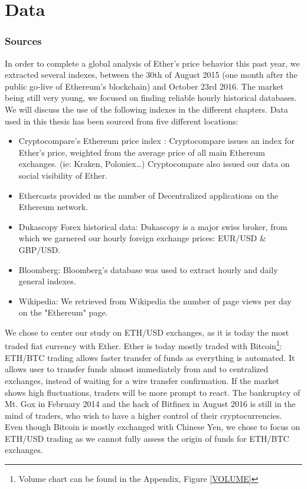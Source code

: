 \documentclass[11pt]{report}
\begin{document}
\clearpage
\chapter*{Data}
\subsection*{Sources}
In order to complete a global analysis of Ether’s price behavior this past year, we extracted several indexes, between the 30th of August 2015 (one month after the public go-live of Ethereum’s blockchain) and October 23rd 2016. The market being still very young, we focused on finding reliable hourly historical databases. We will discuss the use of the following indexes in the different chapters.\newline
 Data used in this thesis has been sourced from five different locations:\begin{itemize}
 \item Cryptocompare’s Ethereum price index \cite{CRYPTOCOMPARE}: Cryptocompare issues an index for Ether’s price, weighted from the average price of all main Ethereum exchanges. (ie: Kraken, Poloniex…) Cryptocompare also issued our data on social visibility of Ether.
 \item Ethercasts\cite{ETHERCASTS} provided us the number of Decentralized applications on the Ethereum network. 
 \item Dukascopy Forex historical data\cite{DUKASCOPY}: Dukascopy is a major swiss broker, from which we garnered our hourly foreign exchange prices: EUR/USD \& GBP/USD.
 \item Bloomberg: Bloomberg’s database was used to extract hourly and daily general indexes.
 \item Wikipedia: We retrieved from Wikipedia the number of page views per day on the "Ethereum" page.
 \end{itemize} 
\clearpage
We chose to center our study on ETH/USD exchanges, as it is today the most traded fiat currency with Ether. Ether is today mostly traded with Bitcoin\footnote{Volume chart can be found in the Appendix, Figure \ref{VOLUME}}: ETH/BTC trading allows faster transfer of funds as everything is automated. It allows user to transfer funds almost immediately from and to centralized exchanges, instead of waiting for a wire transfer confirmation. If the market shows high fluctuations, traders will be more prompt to react. The bankruptcy of Mt. Gox in February 2014 and the hack of Bitfinex in August 2016 is still in the mind of traders, who wish to have a higher control of their cryptocurrencies.\newline
Even though Bitcoin is mostly exchanged with Chinese Yen, we chose to focus on ETH/USD trading as we cannot fully assess the origin of funds for ETH/BTC exchanges. 
\end{document}
